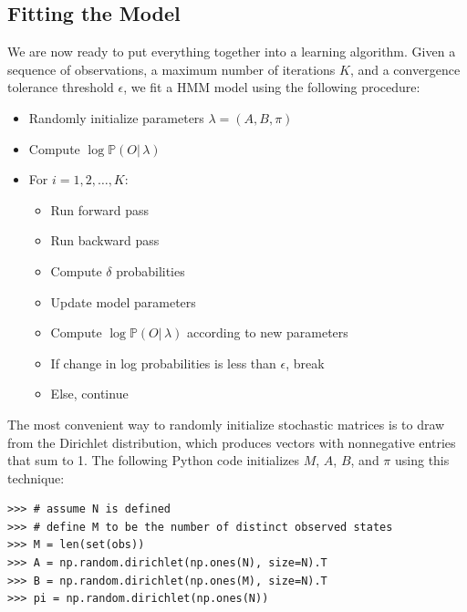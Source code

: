 \subsection*{Fitting the Model}
We are now ready to put everything together into a learning algorithm.
Given a sequence of observations, a maximum number of iterations $K$, and a convergence tolerance threshold $\epsilon$, we fit a HMM model using the following procedure:
\begin{itemize}
\item Randomly initialize parameters $\lambda = (A, B, \pi)$
\item Compute $\log \mathbb{P}(O |\, \lambda)$
\item For $i=1, 2, \ldots, K$:
\begin{itemize}
\item Run forward pass
\item Run backward pass
\item Compute $\delta$ probabilities
\item Update model parameters
\item Compute $\log \mathbb{P}(O |\, \lambda)$ according to new parameters
\item If change in log probabilities is less than $\epsilon$, break
\item Else, continue
\end{itemize}
\end{itemize}

The most convenient way to randomly initialize stochastic matrices is to draw from the Dirichlet distribution,
which produces vectors with nonnegative entries that sum to 1.
The following Python code initializes $M$, $A$, $B$, and $\pi$ using this technique:
\begin{lstlisting}
>>> # assume N is defined
>>> # define M to be the number of distinct observed states
>>> M = len(set(obs))
>>> A = np.random.dirichlet(np.ones(N), size=N).T
>>> B = np.random.dirichlet(np.ones(M), size=N).T
>>> pi = np.random.dirichlet(np.ones(N))
\end{lstlisting}

